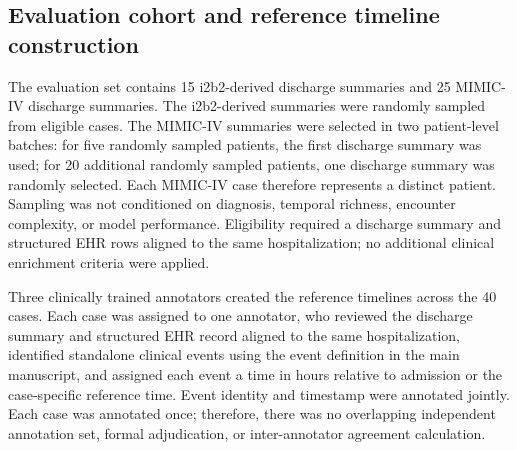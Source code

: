 \FloatBarrier
\subsection{Evaluation cohort and reference timeline construction}\label{ch08:supp:eval-cohort}
\noindent
The evaluation set contains 15 i2b2-derived discharge summaries and 25 MIMIC-IV discharge summaries.
The i2b2-derived summaries were randomly sampled from eligible cases.
The MIMIC-IV summaries were selected in two patient-level batches: for five randomly sampled patients, the first discharge summary was used; for 20 additional randomly sampled patients, one discharge summary was randomly selected.
Each MIMIC-IV case therefore represents a distinct patient.
Sampling was not conditioned on diagnosis, temporal richness, encounter complexity, or model performance.
Eligibility required a discharge summary and structured EHR rows aligned to the same hospitalization; no additional clinical enrichment criteria were applied.

Three clinically trained annotators created the reference timelines across the 40 cases.
Each case was assigned to one annotator, who reviewed the discharge summary and structured EHR record aligned to the same hospitalization, identified standalone clinical events using the event definition in the main manuscript, and assigned each event a time in hours relative to admission or the case-specific reference time.
Event identity and timestamp were annotated jointly.
Each case was annotated once; therefore, there was no overlapping independent annotation set, formal adjudication, or inter-annotator agreement calculation.

